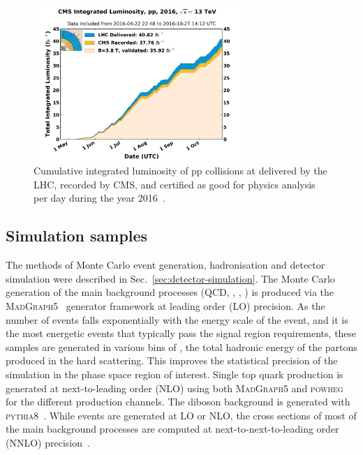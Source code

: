 \begin{figure}[!htb]
\label{fig:lumi}
\includegraphics[width=0.7\textwidth]{figs/analysis/cmslumi}
\caption{Cumulative integrated luminosity of pp collisions at \com delivered by 
the LHC, recorded by CMS, and certified as good for physics analysis per day 
during the year 2016~\cite{cmslumi16}.}
\end{figure}


\subsection{Simulation samples}
\label{sec:analysis-samples-mc}

The methods of Monte Carlo event generation, hadronisation and detector 
simulation were described in Sec.~\ref{sec:detector-simulation}.
The Monte Carlo generation of the main background processes (QCD, \zj, \wj, 
\ttbar) is produced via the \textsc{MadGraph5}~\cite{madgraph5} generator 
framework at leading order (LO) precision. 
As the number of events falls exponentially with the energy scale of the event, 
and it is the most energetic events that typically pass the signal region 
requirements, these samples are generated in various bins of \hthat, the total 
hadronic energy of the partons produced in the hard scattering. 
This improves the statistical precision of the simulation in the phase space 
region of interest.
Single top quark production is generated at next-to-leading order (NLO) using 
both \textsc{MadGraph5} and \textsc{powheg}~\cite{powheg} for the different 
production channels. The diboson background is generated with 
\textsc{pythia8}~\cite{pythia8}.
While events are generated at LO or NLO, the cross sections of most of the main 
background processes are computed at next-to-next-to-leading order (NNLO) 
precision~\cite{adam-lots}.


